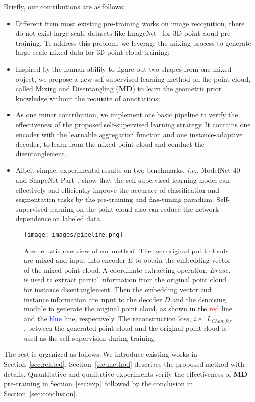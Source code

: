 \documentclass[journal]{IEEEtran}
\def\ie{\emph{i.e.}}
\begin{document}
Briefly, our contributions are as follows: 
\begin{itemize}
\item Different from most existing pre-training works on image recognition, there do not exist large-scale datasets like ImageNet~\cite{ILSVRC15} for 3D point cloud pre-training. To address this problem, we leverage the mixing process to generate large-scale mixed data for 3D point cloud training;

\item Inspired by the human ability to figure out two shapes from one mixed object, we propose a new self-supervised learning method on the point cloud, called Mixing and Disentangling (\textbf{MD}) to learn the geometric prior knowledge without the requisite of annotations;

\item As one minor contribution, we implement one basic pipeline to verify the effectiveness of the proposed self-supervised learning strategy. It contains one encoder with the learnable aggregation function and one instance-adaptive decoder, to learn from the mixed point cloud and conduct the disentanglement. 

\item Albeit simple, experimental results on two benchmarks, \ie, ModelNet-40~\cite{wu20153d} and ShapeNet-Part~\cite{yi2016scalable}, show that the self-supervised learning model can effectively and efficiently improve the accuracy of classification and segmentation tasks by the pre-training and fine-tuning paradigm. Self-supervised learning on the point cloud also can reduce the network dependence on labeled data. 

\end{itemize}

\begin{figure}[t]
\begin{center}
\texttt{[image: images/pipeline.png]}
\end{center}
\vspace{-.15in}
   \caption{A schematic overview of our method. The two original point clouds are mixed and input into encoder $E$ to obtain the embedding vector of the mixed point cloud. A coordinate extracting operation, $Erase$, is used to extract partial information from the original point cloud for instance disentanglement. Then the embedding vector and instance information are input to the decoder $D$ and the denoising module to generate the original point cloud, as shown in the \textcolor{red}{red} line and the \textcolor{blue}{blue} line, respectively. 
   The reconstruction loss, \ie, $L_{Chamfer}$, between the generated point cloud and the original point cloud is used as the self-supervision during training.}
\label{fig:overview}
\end{figure}
The rest is organized as follows. We introduce existing works in Section~\ref{sec:related}. Section~\ref{sec:method} describes the proposed method with details. Quantitative and qualitative experiments verify the effectiveness of \textbf{MD} pre-training in Section~\ref{sec:exp}, followed by the conclusion in Section~\ref{sec:conclusion}. 
\end{document}
